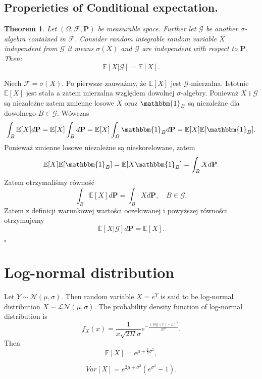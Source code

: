 \documentclass{book}
\newtheorem{theorem}{Theorem}[section]
\newenvironment{proof}
{{\bf Proof. }}{\begin{flushright}$\square$\end{flushright}}
\begin{document}
\subsection{Properieties of Conditional expectation.}
\begin{theorem}
Let $(\varOmega,\mathcal{F},\mathbf{P})$ be measurable space. Further let $\mathcal{G}$ be another $\sigma$-algebra contained in $\mathcal{F}$. Consider random integrable random variable $X$ independent from $\mathcal{G}$ it means $\sigma(X)$ and $\mathcal{G}$ are independent with respect to $\mathbf{P}$. Then:
$$
\mathbb{E}[X|\mathcal{G}]=\mathbb{E}[X].
$$
\end{theorem}
\begin{proof}
Niech $\mathcal{F}=\sigma(X)$. Po pierwsze zauważmy, że $\mathbb{E}[X]$ jest $\mathcal{G}$-mierzalna. Istotnie $\mathbb{E}[X]$ jest stała a zatem mierzalna względem dowolnej $\sigma$-algebry. Ponieważ $X$ i $\mathcal{G}$ są niezależne zatem zmienne losowe $X$ oraz $\mathbbm{1}_{B}$ są niezależne dla dowolnego $B\in\mathcal{G}.$ Wówczas
$$
\int_{B}\mathbb{E}[X]d\mathbf{P}=\mathbb{E}[X]\int_{B}d\mathbf{P}=\mathbb{E}[X]\int_{\varOmega}\mathbbm{1}_{B} d\mathbf{P}=\mathbb{E}[X]\mathbb{E}[\mathbbm{1}_{B}].
$$
Ponieważ zmienne losowe niezależne są nieskorelowane, zatem
$$
\mathbb{E}[X]\mathbb{E}[\mathbbm{1}_{B}]=\mathbb{E}[X\mathbbm{1}_{B}]=\int_{B}Xd\mathbf{P}.
$$
Zatem otrzymaliśmy równość
$$
\int_{B}\mathbb{E}[X]d\mathbf{P}=\int_{B}Xd\mathbf{P},\quad B\in\mathcal{G}.
$$
Zatem z definicji warunkowej wartości oczekiwanej i powyższej równości otrzymujemy 
$$
\mathbb{E}[X|\mathcal{G}]d\mathbf{P}=\mathbb{E}[X].
$$
\end{proof}

\section{Log-normal distribution}
Let $Y\sim\mathcal{N}(\mu,\sigma)$. Then random variable $X=e^{Y}$ is said to be log-normal distribution $X\sim\mathcal{LN}(\mu,\sigma)$. The probability density function of log-normal distribution is
$$
f_{X}(x)=\frac{1}{x\sqrt{2\Pi}\sigma}e^{-\frac{(\log(x)-\mu)^{2}}{2\sigma^{2}}}.
$$
Then
$$
\mathbb{E}[X]=e^{\mu+\frac{1}{2}\sigma^{2}},
$$

$$
Var[X]=e^{2\mu+\sigma^{2}}(e^{\sigma^{2}}-1).
$$
\end{document}
